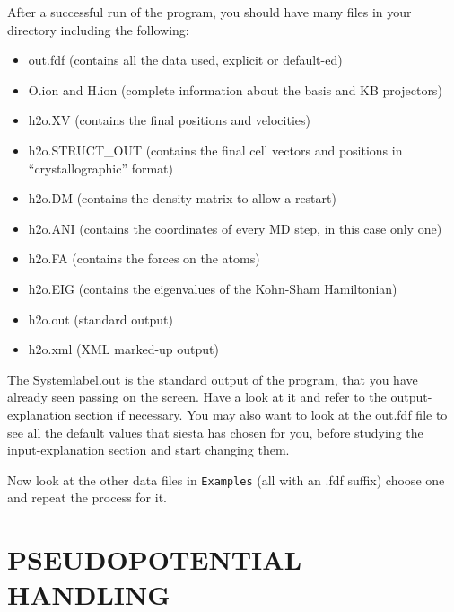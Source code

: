 \documentclass[11pt]{article}
\begin{document}
After a successful run of the program, you should have many
files in your directory including the following:
\begin{itemize}

\item out.fdf
 (contains all the data used, explicit or default-ed) 
\item O.ion and H.ion
 (complete information about the basis and KB projectors)
\item h2o.XV
 (contains the final positions and velocities)
\item h2o.STRUCT\_OUT
 (contains the final cell vectors and positions in
 ``crystallographic'' format)
\item h2o.DM
 (contains the density matrix to allow a restart)
\item h2o.ANI
 (contains the coordinates of every MD step, in this case only one)
\item h2o.FA
 (contains the forces on the atoms)
\item h2o.EIG
 (contains the eigenvalues of the Kohn-Sham Hamiltonian)
\item h2o.out
 (standard output)
\item h2o.xml
 (XML marked-up output)
\end{itemize}

The Systemlabel.out is the standard output of the program, that you
have already seen passing on the screen. Have a look at it
and refer to the output-explanation section if necessary.
You may also want to look at the out.fdf file to see all
the default values that siesta has chosen for you, before
studying the input-explanation section and start changing them.

Now look at the other data files in {\tt Examples}
(all with an .fdf suffix) choose one and repeat the process for it.


\section{PSEUDOPOTENTIAL HANDLING}

\end{document}
